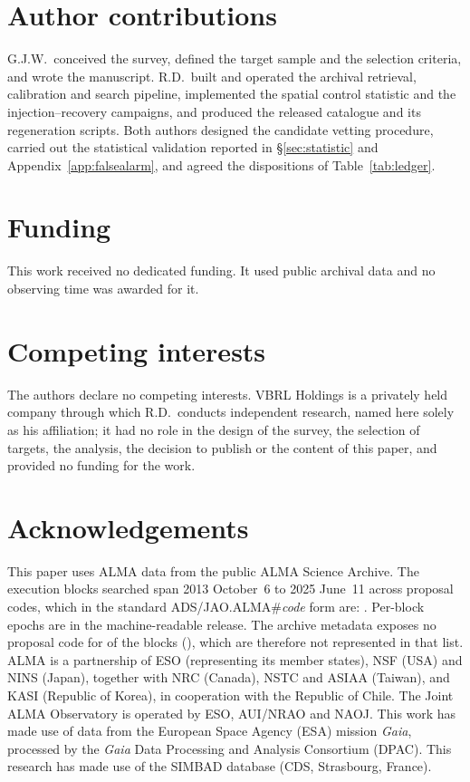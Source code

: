\section*{Author contributions}
G.J.W.\ conceived the survey, defined the target sample and the selection
criteria, and wrote the manuscript. R.D.\ built and operated the archival
retrieval, calibration and search pipeline, implemented the spatial control
statistic and the injection--recovery campaigns, and produced the released
catalogue and its regeneration scripts. Both authors designed the candidate
vetting procedure, carried out the statistical validation reported in
\S\ref{sec:statistic} and Appendix~\ref{app:falsealarm}, and agreed the
dispositions of Table~\ref{tab:ledger}.

\section*{Funding}
This work received no dedicated funding. It used public archival data and
no observing time was awarded for it.

\section*{Competing interests}
The authors declare no competing interests. VBRL Holdings is a privately
held company through which R.D.\ conducts independent research, named
here solely as his affiliation; it had no role in the design of the
survey, the selection of targets, the analysis, the decision to publish
or the content of this paper, and provided no funding for the work.

\section*{Acknowledgements}
This paper uses ALMA data from the public ALMA Science Archive. The \NEB{}
execution blocks searched span 2013 October~6 to 2025 June~11 across
\NProjCodes{} proposal codes, which in the standard
ADS/JAO.ALMA\#\textit{code} form are:
. Per-block epochs are in the machine-readable release. The
archive metadata exposes no proposal code for \NProjCodeUnres{} of the
\NEB{} blocks (\ProjCodeUnresList), which are therefore not represented in
that list. ALMA is a partnership of ESO
(representing its member states), NSF (USA) and NINS (Japan), together with NRC
(Canada), NSTC and ASIAA (Taiwan), and KASI (Republic of Korea), in cooperation
with the Republic of Chile. The Joint ALMA Observatory is operated by ESO,
AUI/NRAO and NAOJ. This work has made use of data from the European Space
Agency (ESA) mission {\it Gaia}, processed by the {\it Gaia} Data Processing and
Analysis Consortium (DPAC). This research has made use of the SIMBAD
database (CDS, Strasbourg, France).

